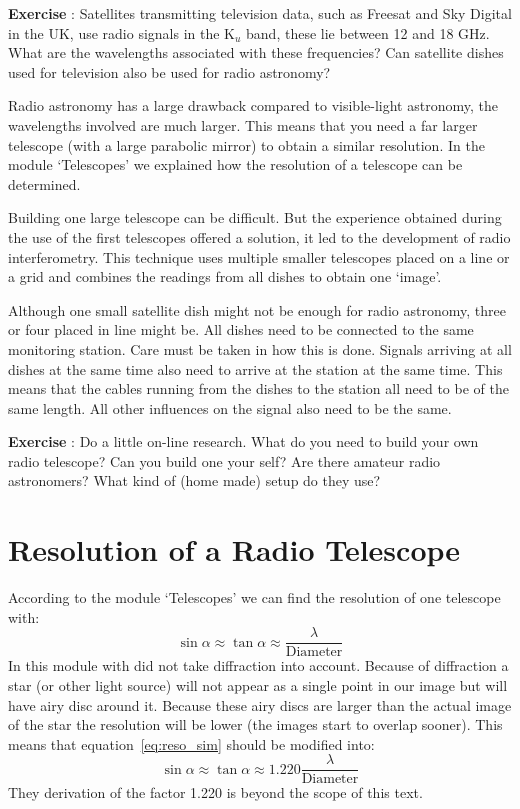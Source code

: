 \documentclass[12pt,a4paper]{article}
\numberwithin{equation}{section}
\numberwithin{figure}{section}
\newcounter{Exercise}
\numberwithin{table}{section}
\begin{document}
\begin{shaded}
\textbf{Exercise \theExercise {}} : Satellites transmitting television data, such as Freesat and Sky Digital in the UK, use radio signals in the K$_u$ band, these lie between 12 and 18 GHz. What are the wavelengths associated with these frequencies? Can satellite dishes used for television also be used for radio astronomy?\end{shaded}

Radio astronomy has a large drawback compared to visible-light astronomy, the wavelengths involved are much larger. This means that you need a far larger telescope (with a large parabolic mirror) to obtain a similar resolution. In the module `Telescopes' we explained how the resolution of a telescope can be determined.

Building one large telescope can be difficult. But the experience obtained during the use of the first telescopes offered a solution, it led to the development of radio interferometry. This technique uses multiple smaller telescopes placed on a line or a grid and combines the readings from all dishes to obtain one `image'.

Although one small satellite dish might not be enough for radio astronomy, three or four placed in line might be. All dishes need to be connected to the same monitoring station. Care must be taken in how this is done. Signals arriving at all dishes at the same time also need to arrive at the station at the same time. This means that the cables running from the dishes to the station all need to be of the same length. All other influences on the signal also need to be the same.

\begin{shaded}
\textbf{Exercise \theExercise {}} : Do a little on-line research. What do you need to build your own radio telescope? Can you build one your self? Are there amateur radio astronomers? What kind of (home made) setup do they use?\end{shaded}

\section{Resolution of a Radio Telescope}
According to the module `Telescopes' we can find the resolution of one telescope with:
\begin{equation}
\sin \alpha \approx \tan \alpha \approx \frac{\lambda}{\mbox{Diameter}} \label{eq:reso_sim}
\end{equation}
In this module with did not take diffraction into account. Because of diffraction a star (or other light source) will not appear as a single point in our image but will have airy disc around it. Because these airy discs are larger than the actual image of the star the resolution will be lower (the images start to overlap sooner). This means that equation~\ref{eq:reso_sim} should be modified into:
\begin{equation}
\sin \alpha \approx \tan \alpha \approx 1.220 \frac{\lambda}{\mbox{Diameter}} \label{eq:reso}
\end{equation}
They derivation of the factor 1.220 is beyond the scope of this text. 
\end{document}
